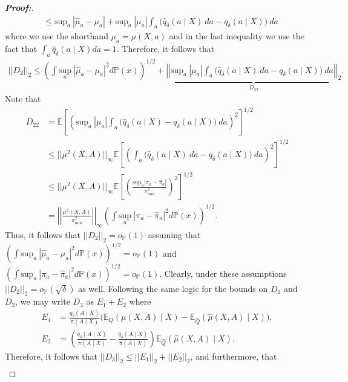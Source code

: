 \documentclass[11pt,twoside]{article}
\theoremstyle{definition}
\theoremstyle{remark}
\let\hat\widehat
\begin{document}
\begin{proof}[\textbf{Proof:}]
\begin{align*}
   &\leq \text{sup}_a \ |\hat{\mu}_a - \mu_a| + \text{sup}_a \ | \mu_a| \int_a  \big(\hat{q}_\delta(a \mid X) \ da -  q_\delta(a \mid X)\big) \ da \tag{$i$}
\end{align*}
where we use the shorthand $\mu_a = \mu(X, a)$ and in the last inequality we use the fact that $\int_a \hat{q}_\delta(a \mid X)da = 1$. Therefore, it follows that
\begin{align*}
    ||D_2||_2 \leq \left(\int  \underset{a}{\text{sup}} \ |\hat{\mu}_a - \mu_a|^2 d\mathbb{P}(x) \right)^{1/2} + \underbrace{\left| \left|\text{sup}_a \ | \mu_a| \int_a  \big(\hat{q}_\delta(a \mid X) \ da -  q_\delta(a \mid X)\big) \ da \right| \right|_2}_{D_{22}}.
\end{align*}
Note that
\begin{align*}
     D_{22} &= \mathbb{E} \left[\left(\text{sup}_a \ | \mu_a| \int_a  \big(\hat{q}_\delta(a \mid X) -  q_\delta(a \mid X)\big) \ da \right)^2 \right]^{1/2} \\
     &\leq  ||\mu^2(X, A)||_\infty \mathbb{E} \left[\left( \int_a  \big(\hat{q}_\delta(a \mid X) \ da -  q_\delta(a \mid X)\big) \ da \right)^2 \right]^{1/2} \\
    &\leq  ||\mu^2(X, A)||_\infty \mathbb{E} \left[\left(\frac{\text{sup}_a |\pi_a - \widehat\pi_a|}{\pi_{\min}^2}  \right)^2 \right]^{1/2} \\
    &= \left|\left|\frac{\mu^2(X, A)}{\pi^2_{\min}}\right|\right|_\infty \left( \int \underset{a}{\text{sup}} \ |\pi_a - \widehat\pi_a|^2 d \mathbb{P}(x) \right)^{1/2}.
\end{align*}
Thus, it follows that $||D_2||_2 = o_\mathbb{P}(1)$ assuming that $(\int \text{sup}_a \ |\hat{\mu}_a - \mu_a|^2 d\mathbb{P}(x))^{1/2} = o_\mathbb{P}(1)$ and $( \int \text{sup}_a \ |\pi_a - \widehat\pi_a|^2 d \mathbb{P}(x))^{1/2} = o_\mathbb{P}(1)$. Clearly, under these assumptions $||D_2||_2 = o_\mathbb{P}(\sqrt{\delta})$ as well. Following the same logic for the bounds on $D_1$ and $D_2$, we may write $D_3$ as $E_1 + E_2$ where
\begin{align*}
    E_1 &= \frac{q_\delta(A \mid X)}{\pi(A \mid X)}\Big(\mathbb{E}_Q(\mu(X, A) \mid X) - \mathbb{E}_{\hat{Q}}(\hat{\mu}(X, A) \mid X) \Big), \\
    E_2 &=\left(\frac{q_\delta(A \mid X)}{\pi(A \mid X)} - \frac{\hat{q}_\delta(A \mid X)}{\hat{\pi}(A \mid X)}\right)\mathbb{E}_{\hat{Q}}(\hat{\mu}(X, A) \mid X).
\end{align*}
Therefore, it follows that $||D_3||_2 \leq ||E_1||_2 + ||E_2||_2$, and furthermore, that
\begin{align*}

\end{align*}
\end{proof}
\end{document}

